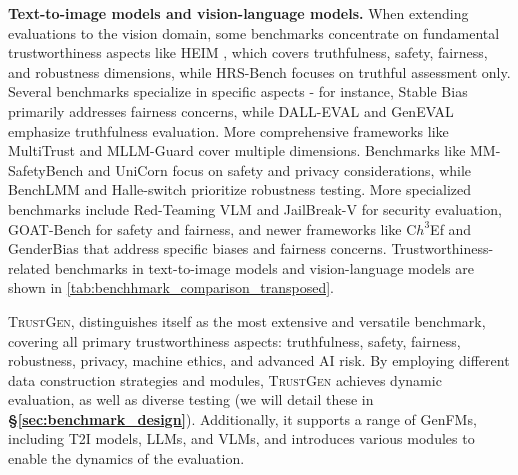 \textbf{Text-to-image models and vision-language models.} When extending evaluations to the vision domain, some benchmarks concentrate on fundamental trustworthiness aspects like HEIM \cite{lee2023holisticevaluationtexttoimagemodels}, which covers truthfulness, safety, fairness, and robustness dimensions, while HRS-Bench \cite{2304.05390} focuses on truthful assessment only. Several benchmarks specialize in specific aspects - for instance, Stable Bias \cite{luccioni2024stable} primarily addresses fairness concerns, while DALL-EVAL \cite{cho2023dall} and GenEVAL \cite{ghosh2024geneval} emphasize truthfulness evaluation. More comprehensive frameworks like MultiTrust \cite{zhang2024benchmarkingtrustworthinessmultimodallarge} and MLLM-Guard \cite{gu2024mllmguard} cover multiple dimensions. Benchmarks like MM-SafetyBench \cite{liu2024mmsafetybenchbenchmarksafetyevaluation} and UniCorn \cite{tu2023unicornsimagesafetyevaluation} focus on safety and privacy considerations, while BenchLMM \cite{cai2023benchlmmbenchmarkingcrossstylevisual} and Halle-switch \cite{zhai2023halle} prioritize robustness testing. More specialized benchmarks include Red-Teaming VLM \cite{li2024redteamingvisuallanguage} and JailBreak-V \cite{luo2024jailbreakv28kbenchmarkassessingrobustness} for security evaluation, GOAT-Bench \cite{lin2024goat} for safety and fairness, and newer frameworks like C$h^{3}$Ef \cite{shi2024assessment} and GenderBias \cite{xiao2024genderbias} that address specific biases and fairness concerns. Trustworthiness-related benchmarks in text-to-image models and vision-language models are shown in \autoref{tab:benchhmark_comparison_transposed}.

\textsc{TrustGen}, distinguishes itself as the most extensive and versatile benchmark, covering all primary trustworthiness aspects: truthfulness, safety, fairness, robustness, privacy, machine ethics, and advanced AI risk. By employing different data construction strategies and modules, \textsc{TrustGen} achieves dynamic evaluation, as well as diverse testing (we will detail these in \textbf{\S\ref{sec:benchmark_design}}). Additionally, it supports a range of GenFMs, including T2I models, LLMs, and VLMs, and introduces various modules to enable the dynamics of the evaluation.







